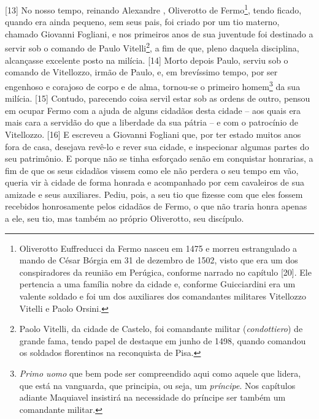 {[}13{]} No nosso tempo, reinando Alexandre , Oliverotto de
Fermo\footnote{Oliverotto Euffreducci da Fermo nasceu em 1475 e morreu
  estrangulado a mando de César Bórgia em 31 de dezembro de 1502, visto
  que era um dos conspiradores da reunião em Perúgica, conforme narrado
  no capítulo  {[}20{]}. Ele pertencia a uma família nobre da cidade
  e, conforme Guicciardini era um valente soldado e foi um dos
  auxiliares dos comandantes militares Vitellozzo Vitelli e Paolo
  Orsini.}, tendo ficado, quando era ainda pequeno, sem seus pais, foi
criado por um tio materno, chamado Giovanni Fogliani, e nos primeiros
anos de sua juventude foi destinado a servir sob o comando de Paulo
Vitelli\footnote{Paolo Vitelli, da cidade de Castelo, foi comandante
  militar (\emph{condottiero}) de grande fama, tendo papel de destaque
  em junho de 1498, quando comandou os soldados florentinos na
  reconquista de Pisa.}, a fim de que, pleno daquela disciplina,
alcançasse excelente posto na milícia. {[}14{]} Morto depois Paulo,
serviu sob o comando de Vitellozzo, irmão de Paulo, e, em brevíssimo
tempo, por ser engenhoso e corajoso de corpo e de alma, tornou-se o
primeiro homem\footnote{\emph{Primo uomo} que bem pode ser compreendido
  aqui como aquele que lidera, que está na vanguarda, que principia, ou
  seja, um \emph{príncipe}. Nos capítulos adiante Maquiavel insistirá na
  necessidade do príncipe ser também um comandante militar.} da sua
milícia. {[}15{]} Contudo, parecendo coisa servil estar sob as ordens de
outro, pensou em ocupar Fermo com a ajuda de alguns cidadãos desta
cidade -- aos quais era mais cara a servidão do que a liberdade da sua
pátria -- e com o patrocínio de Vitellozzo. {[}16{]} E escreveu a
Giovanni Fogliani que, por ter estado muitos anos fora de casa, desejava
revê-lo e rever sua cidade, e inspecionar algumas partes do seu
patrimônio. E porque não se tinha esforçado senão em conquistar
honrarias, a fim de que os seus cidadãos vissem como ele não perdera o
seu tempo em vão, queria vir à cidade de forma honrada e acompanhado por
cem cavaleiros de sua amizade e seus auxiliares. Pediu, pois, a seu tio
que fizesse com que eles fossem recebidos honrosamente pelos cidadãos de
Fermo, o que não traria honra apenas a ele, seu tio, mas também ao
próprio Oliverotto, seu discípulo.

